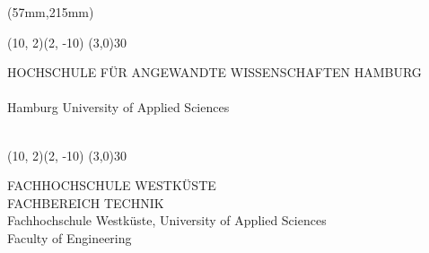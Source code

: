 \begin{titlepage}
\begin{textblock*}{\textwidth}(57mm,215mm)
  \begin{minipage}[b][0cm][t]{0.95\textwidth}
		\fontsize{10pt}{11pt}\selectfont
		\begin{picture}(10, 2)(2, -10)
			\linethickness{0.9mm}
			\line(3,0){30}
		\end{picture}
		\vspace{-5mm}
		\begin{flushleft}
			HOCHSCHULE FÜR ANGEWANDTE WISSENSCHAFTEN HAMBURG\\\MakeUppercase{\FacultyDE}\\[2mm]
			Hamburg University of Applied Sciences\\\FacultyEN\\[7mm]
		\end{flushleft}
		
		\begin{picture}(10, 2)(2, -10)
			\linethickness{0.9mm}
			\line(3,0){30}
		\end{picture}
		\vspace{-5mm}
		\begin{flushleft}
			FACHHOCHSCHULE WESTKÜSTE\\FACHBEREICH TECHNIK\\[2mm]
			Fachhochschule Westküste, University of Applied Sciences\\Faculty of Engineering\\
		\end{flushleft}
  \end{minipage}
\end{textblock*}

\hypersetup{pageanchor=true}
\end{titlepage}
\   %
